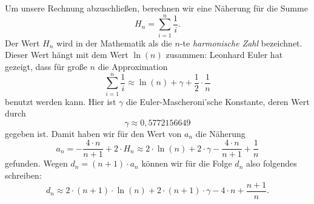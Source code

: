 Um unsere Rechnung abzuschließen, berechnen wir eine Näherung für die Summe 
\[ H_n = \sum\limits_{i=1}^{n}\frac{1}{i}.\]
Der Wert $H_n$ wird in der Mathematik als die $n$-te \emph{harmonische Zahl} bezeichnet.
Dieser Wert hängt mit dem Wert $\ln(n)$ zusammen: Leonhard Euler hat gezeigt, dass für
große $n$ die Approximation
\[ \sum\limits_{i=1}^n \frac{1}{i} \approx \ln(n) + \gamma + \frac{1}{2} \cdot \frac{1}{n} \]
benutzt werden kann.  Hier ist $\gamma$ die Euler-Mascheroni'sche Konstante, deren Wert durch
\[ \gamma \approx 0,5772156649 \]
gegeben ist.  Damit haben wir für den Wert von $a_n$ die Näherung
\[ a_n = - \frac{4 \cdot n}{n+1} + 2 \cdot H_n \approx  
         2 \cdot \ln(n) + 2 \cdot \gamma - \frac{4 \cdot n}{n+1} + \frac{1}{n} 
\]
gefunden. Wegen $d_n = (n+1) \cdot a_n$ können wir für die Folge $d_n$ also folgendes schreiben:
\[ d_n \approx  
       2 \cdot (n + 1) \cdot \ln(n) + 2 \cdot (n+1) \cdot \gamma - 4 \cdot n + \frac{n+1}{n}.
\]


